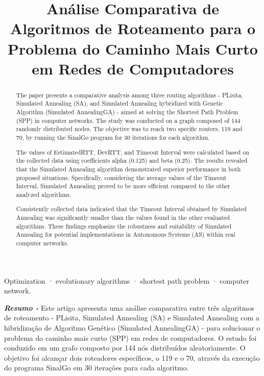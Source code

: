 \documentclass[conference]{IEEEtran}
\begin{document}
\title{Análise Comparativa de Algoritmos de Roteamento para o Problema do Caminho Mais Curto em Redes de Computadores}

\author{
}

\maketitle

\begin{abstract}
The paper presents a comparative analysis among three routing algorithms - PLisita, Simulated Annealing (SA), and Simulated Annealing hybridized with Genetic Algorithm (Simulated AnnealingGA) - aimed at solving the Shortest Path Problem (SPP) in computer networks. The study was conducted on a graph composed of 144 randomly distributed nodes. The objective was to reach two specific routers, 119 and 70, by running the SinalGo program for 30 iterations for each algorithm.

The values of EstimatedRTT, DevRTT, and Timeout Interval were calculated based on the collected data using coefficients alpha (0.125) and beta (0.25). The results revealed that the Simulated Annealing algorithm demonstrated superior performance in both proposed situations. Specifically, considering the average values of the Timeout Interval, Simulated Annealing proved to be more efficient compared to the other analyzed algorithms.

Consistently collected data indicated that the Timeout Interval obtained by Simulated Annealing was significantly smaller than the values found in the other evaluated algorithms. These findings emphasize the robustness and suitability of Simulated Annealing for potential implementations in Autonomous Systems (AS) within real computer networks.
\end{abstract}

\begin{IEEEkeywords}
Optimization · evolutionary algorithms · shortest path problem  · computer network.
\end{IEEEkeywords}

\textbf{\textit{Resumo -}} Este artigo apresenta uma análise comparativa entre três algoritmos de roteamento - PLisita, Simulated Annealing (SA) e Simulated Annealing com a hibridização de Algoritmo Genético (Simulated AnnealingGA) - para solucionar o problema do caminho mais curto (SPP) em redes de computadores. O estudo foi conduzido em um grafo composto por 144 nós distribuídos aleatoriamente. O objetivo foi alcançar dois roteadores específicos, o 119 e o 70, através da execução do programa SinalGo em 30 iterações para cada algoritmo.
\end{document}
